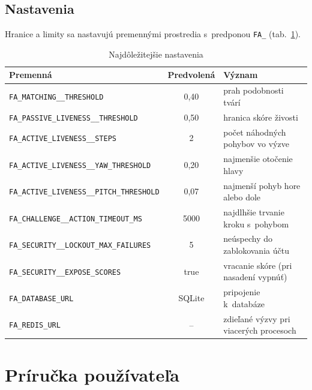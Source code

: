 \documentclass[12pt,a4paper,oneside]{report}
\begin{document}
\subsection*{Nastavenia}
Hranice a limity sa nastavujú premennými prostredia s~predponou \texttt{FA\_}
(tab.~\ref{tab:konfiguracia}).

\begin{table}[H]
  \centering
  \caption{Najdôležitejšie nastavenia}
  \label{tab:konfiguracia}
  \small
  \begin{tabularx}{\textwidth}{@{}l c X@{}}
    \toprule
    Premenná & Predvolená & Význam \\
    \midrule
    \texttt{FA\_MATCHING\_\_THRESHOLD} & 0,40 & prah podobnosti tvárí \\
    \texttt{FA\_PASSIVE\_LIVENESS\_\_THRESHOLD} & 0,50 & hranica skóre živosti \\
    \texttt{FA\_ACTIVE\_LIVENESS\_\_STEPS} & 2 & počet náhodných pohybov vo výzve \\
    \texttt{FA\_ACTIVE\_LIVENESS\_\_YAW\_THRESHOLD} & 0,20 & najmenšie otočenie hlavy \\
    \texttt{FA\_ACTIVE\_LIVENESS\_\_PITCH\_THRESHOLD} & 0,07 & najmenší pohyb hore alebo dole \\
    \texttt{FA\_CHALLENGE\_\_ACTION\_TIMEOUT\_MS} & 5000 & najdlhšie trvanie kroku s~pohybom \\
    \texttt{FA\_SECURITY\_\_LOCKOUT\_MAX\_FAILURES} & 5 & neúspechy do zablokovania účtu \\
    \texttt{FA\_SECURITY\_\_EXPOSE\_SCORES} & true & vracanie skóre (pri nasadení vypnúť) \\
    \texttt{FA\_DATABASE\_URL} & SQLite & pripojenie k~databáze \\
    \texttt{FA\_REDIS\_URL} & -- & zdieľané výzvy pri viacerých procesoch \\
    \bottomrule
  \end{tabularx}
\end{table}

\section{Príručka používateľa}
\end{document}
